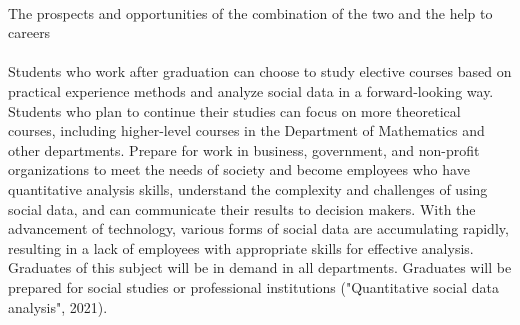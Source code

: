 \documentclass{article}
\begin{document}
	\\
	The prospects and opportunities of the combination of the two and the help to careers \\
	\\
	Students who work after graduation can choose to study elective courses based on practical experience methods and analyze social data in a forward-looking way. Students who plan to continue their studies can focus on more theoretical courses, including higher-level courses in the Department of Mathematics and other departments. Prepare for work in business, government, and non-profit organizations to meet the needs of society and become employees who have quantitative analysis skills, understand the complexity and challenges of using social data, and can communicate their results to decision makers. With the advancement of technology, various forms of social data are accumulating rapidly, resulting in a lack of employees with appropriate skills for effective analysis. Graduates of this subject will be in demand in all departments. Graduates will be prepared for social studies or professional institutions ("Quantitative social data analysis", 2021). \\
	\\
\end{document}
